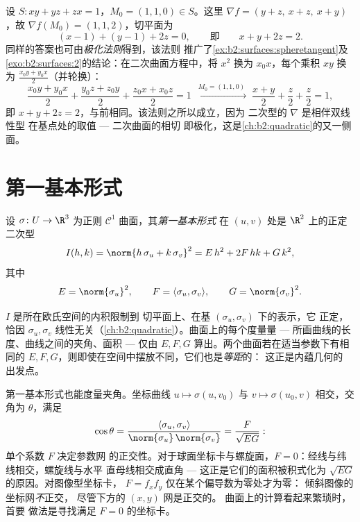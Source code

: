 \begin{example}\label{ex:b2:surfaces:polarization}
设 $S : xy + yz + zx = 1$，$M_0 = (1, 1, 0) \in S$。这里
$\nabla f = (y + z,\ x + z,\ x + y)$，故 $\nabla f(M_0) = (1,
1, 2)$，切平面为
\[
(x - 1) + (y - 1) + 2z = 0,
\qquad\text{即}\qquad x + y + 2z = 2 .
\]
同样的答案也可由\emph{极化法则}得到，该法则
推广了\cref{ex:b2:surfaces:spheretangent}及
\cref{exo:b2:surfaces:2}的结论：在二次曲面方程中，将
$x^2$ 换为 $x_0x$，每个乘积 $xy$ 换为 $\frac{x_0y +
y_0x}2$（并轮换）：
\[
\frac{x_0y + y_0x}2 + \frac{y_0z + z_0y}2 + \frac{z_0x +
x_0z}2 = 1
\;\xrightarrow{\ M_0 = (1,1,0)\ }\;
\frac{x + y}2 + \frac z2 + \frac z2 = 1 ,
\]
即 $x + y + 2z = 2$，与前相同。该法则之所以成立，因为
二次型的 $\nabla$ 是相伴双线性型
在基点处的取值 --- 二次曲面的相切
即极化，这是\cref{ch:b2:quadratic}的又一侧面。
\end{example}

\section{第一基本形式}

\begin{definition}[第一基本形式]\label{def:b2:surfaces:fff}
设 $\sigma \colon U \to \R^3$ 为正则 $\mathcal{C}^1$
曲面，其\emph{第一基本形式}
在 $(u,v)$ 处是
$\R^2$ 上的正定二次型
\[
I(h, k) = \norm{h\,\sigma_u + k\,\sigma_v}^2
= E\,h^2 + 2F\,hk + G\,k^2,
\]
其中
\[
E = \norm{\sigma_u}^2,
\qquad
F = \langle \sigma_u, \sigma_v\rangle,
\qquad
G = \norm{\sigma_v}^2 .
\]
\end{definition}

\begin{remark}
$I$ 是所在欧氏空间的内积限制到
切平面上、在基 $(\sigma_u, \sigma_v)$ 下的表示，它
正定，恰因 $\sigma_u, \sigma_v$
线性无关（\cref{ch:b2:quadratic}）。曲面上的每个度量量
--- 所画曲线的长度、曲线之间的夹角、面积 ---
仅由 $E, F, G$ 算出。两个曲面若在适当参数下有相同的 $E,
F, G$，则即使在空间中摆放不同，它们也是\emph{等距}的：
这正是内蕴几何的
出发点。
\end{remark}

\begin{example}[坐标曲线间的
夹角]\label{ex:b2:surfaces:coordangle}
第一基本形式也能度量夹角。坐标曲线
$u \mapsto \sigma(u, v_0)$ 与 $v \mapsto
\sigma(u_0, v)$ 相交，交角为 $\theta$，满足
\[
\cos\theta = \frac{\langle\sigma_u,
\sigma_v\rangle}{\norm{\sigma_u}\,\norm{\sigma_v}}
= \frac{F}{\sqrt{EG}} :
\]
单个系数 $F$ 决定参数网
的正交性。对于球面坐标卡与螺旋面，$F =
0$：经线与纬线相交，螺旋线与水平
直母线相交成直角 --- 这正是它们的面积被积式化为
$\sqrt{EG}$ 的原因。对图像型坐标卡，
$F = f_xf_y$ 仅在某个偏导数为零处才为零：
倾斜图像的坐标网\emph{不}正交，
尽管下方的 $(x, y)$ 网是正交的。
曲面上的计算看起来繁琐时，首要
做法是寻找满足 $F = 0$ 的坐标卡。
\end{example}

